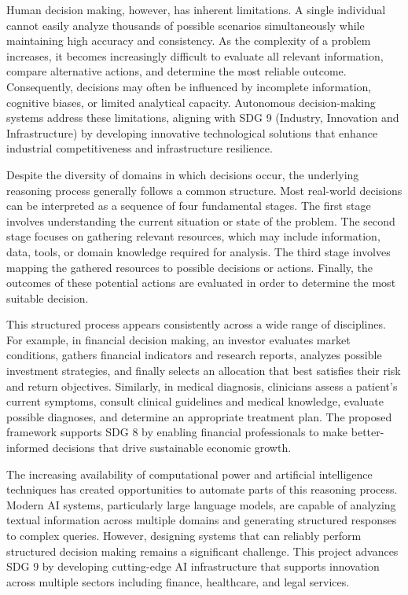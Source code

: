 \documentclass[12pt,a4paper,oneside]{report}
\theoremstyle{definition}
\theoremstyle{remark}
\begin{document}
Human decision making, however, has inherent limitations. A single individual cannot easily analyze thousands of possible scenarios simultaneously while maintaining high accuracy and consistency. As the complexity of a problem increases, it becomes increasingly difficult to evaluate all relevant information, compare alternative actions, and determine the most reliable outcome. Consequently, decisions may often be influenced by incomplete information, cognitive biases, or limited analytical capacity. Autonomous decision-making systems address these limitations, aligning with SDG 9 (Industry, Innovation and Infrastructure) by developing innovative technological solutions that enhance industrial competitiveness and infrastructure resilience.

Despite the diversity of domains in which decisions occur, the underlying reasoning process generally follows a common structure. Most real-world decisions can be interpreted as a sequence of four fundamental stages. The first stage involves understanding the current situation or state of the problem. The second stage focuses on gathering relevant resources, which may include information, data, tools, or domain knowledge required for analysis. The third stage involves mapping the gathered resources to possible decisions or actions. Finally, the outcomes of these potential actions are evaluated in order to determine the most suitable decision.

This structured process appears consistently across a wide range of disciplines. For example, in financial decision making, an investor evaluates market conditions, gathers financial indicators and research reports, analyzes possible investment strategies, and finally selects an allocation that best satisfies their risk and return objectives. Similarly, in medical diagnosis, clinicians assess a patient's current symptoms, consult clinical guidelines and medical knowledge, evaluate possible diagnoses, and determine an appropriate treatment plan. The proposed framework supports SDG 8 by enabling financial professionals to make better-informed decisions that drive sustainable economic growth.

The increasing availability of computational power and artificial intelligence techniques has created opportunities to automate parts of this reasoning process. Modern AI systems, particularly large language models, are capable of analyzing textual information across multiple domains and generating structured responses to complex queries. However, designing systems that can reliably perform structured decision making remains a significant challenge. This project advances SDG 9 by developing cutting-edge AI infrastructure that supports innovation across multiple sectors including finance, healthcare, and legal services.
\end{document}
